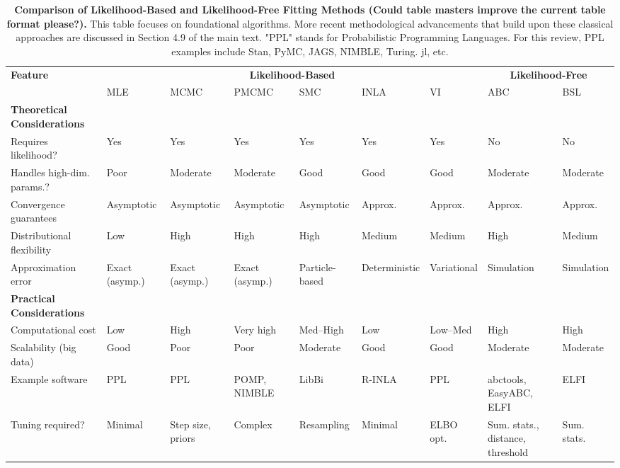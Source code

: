 \documentclass{article}
\begin{document}
\begin{landscape}
\begin{table}[ht]
\renewcommand{\arraystretch}{1.2}
\centering
\caption{\textbf{Comparison of Likelihood-Based and Likelihood-Free Fitting Methods (Could table masters improve the current table format please?).} 
This table focuses on foundational algorithms. More recent methodological advancements that build upon these classical approaches are discussed in Section 4.9 of the main text. "PPL" stands for Probabilistic Programming Languages. For this review, PPL examples include Stan, PyMC, JAGS, NIMBLE, Turing. jl, etc.}
\label{tab:methods_comparison}
\small
\begin{tabular}{@{}p{3.2cm}p{1.5cm}p{1.5cm}p{1.5cm}p{1.5cm}p{1.5cm}p{1.5cm}p{1.5cm}p{1.5cm}@{}}
\toprule
\multirow{2}{*}{\textbf{Feature}} & \multicolumn{6}{c}{\textbf{Likelihood-Based}} & \multicolumn{2}{c}{\textbf{Likelihood-Free}} \\
\cmidrule(lr){2-7} \cmidrule(lr){8-9}
 & MLE & MCMC & PMCMC & SMC & INLA & VI & ABC & BSL \\
\midrule
\textbf{Theoretical Considerations} & & & & & & & & \\
\midrule
Requires likelihood? & Yes & Yes & Yes & Yes & Yes & Yes & No & No \\
Handles high-dim. params.? & Poor & Moderate & Moderate & Good & Good & Good & Moderate & Moderate \\
Convergence guarantees & Asymptotic & Asymptotic & Asymptotic & Asymptotic & Approx. & Approx. & Approx. & Approx. \\
Distributional flexibility & Low & High & High & High & Medium & Medium & High & Medium \\
Approximation error & Exact (asymp.) & Exact (asymp.) & Exact (asymp.) & Particle-based & Deterministic & Variational & Simulation & Simulation \\
\midrule
\textbf{Practical Considerations} & & & & & & & & \\
\midrule
Computational cost & Low & High & Very high & Med--High & Low & Low--Med & High & High \\
Scalability (big data) & Good & Poor & Poor & Moderate & Good & Good & Moderate & Moderate \\
Example software & PPL & PPL & POMP, NIMBLE & LibBi & R-INLA & PPL &abctools, EasyABC, ELFI & ELFI \\
Tuning required? & Minimal & Step size, priors & Complex & Resampling & Minimal & ELBO opt. & Sum. stats., distance, threshold & Sum. stats. \\

\end{tabular}
\end{table}
\end{landscape}
\end{document}
